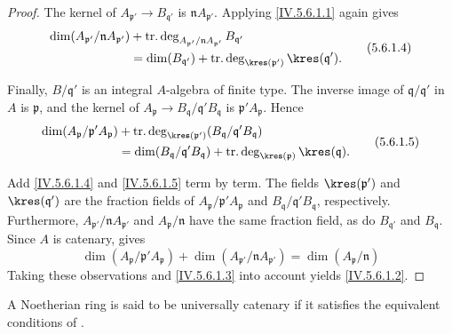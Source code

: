 \begin{proof}
The kernel of
$A_{\mathfrak p'}\to B_{\mathfrak q'}$ is
$\mathfrak nA_{\mathfrak p'}$.  Applying
\eqref{IV.5.6.1.1} again gives
\begin{equation}
\begin{split}
\dim(A_{\mathfrak p'}/\mathfrak nA_{\mathfrak p'})
 &+\operatorname{tr.deg}_{
      A_{\mathfrak p'}/\mathfrak nA_{\mathfrak p'}}
      B_{\mathfrak q'}\\
 &=\dim(B_{\mathfrak q'})
   +\operatorname{tr.deg}_{\kres(\mathfrak p')}
      \kres(\mathfrak q').
\end{split}
\tag{5.6.1.4}\label{IV.5.6.1.4}
\end{equation}

Finally, $B/\mathfrak q'$ is an integral $A$-algebra of finite type.
The inverse image of $\mathfrak q/\mathfrak q'$ in $A$ is
$\mathfrak p$, and the kernel of $A_{\mathfrak p}\longrightarrow
B_{\mathfrak q}/\mathfrak q'B_{\mathfrak q}$
is $\mathfrak p'A_{\mathfrak p}$.  Hence
\begin{equation}
\begin{split}
\dim(A_{\mathfrak p}/\mathfrak p'A_{\mathfrak p})
 &+\operatorname{tr.deg}_{\kres(\mathfrak p')}
   (B_{\mathfrak q}/\mathfrak q'B_{\mathfrak q})\\
 &=\dim(B_{\mathfrak q}/\mathfrak q'B_{\mathfrak q})
   +\operatorname{tr.deg}_{\kres(\mathfrak p)}
      \kres(\mathfrak q).
\end{split}
\tag{5.6.1.5}\label{IV.5.6.1.5}
\end{equation}

Add \eqref{IV.5.6.1.4} and \eqref{IV.5.6.1.5} term by term.
The fields $\kres(\mathfrak p')$ and
$\kres(\mathfrak q')$ are the fraction fields of
$A_{\mathfrak p}/\mathfrak p'A_{\mathfrak p}$ and
$B_{\mathfrak q}/\mathfrak q'B_{\mathfrak q}$, respectively.
Furthermore,
$A_{\mathfrak p'}/\mathfrak nA_{\mathfrak p'}$ and
$A_{\mathfrak p}/\mathfrak n$ have the same fraction field, as do
$B_{\mathfrak q'}$ and $B_{\mathfrak q}$.  Since $A$ is catenary,
 gives
\[
\dim(A_{\mathfrak p}/\mathfrak p'A_{\mathfrak p})
 +\dim(A_{\mathfrak p'}/\mathfrak nA_{\mathfrak p'})
 =\dim(A_{\mathfrak p}/\mathfrak n)
\]
Taking these observations and \eqref{IV.5.6.1.3} into account yields
\eqref{IV.5.6.1.2}.
\end{proof}

\begin{definition}[5.6.2]
\label{IV.5.6.2}
A Noetherian ring is said to be universally catenary if it
satisfies the equivalent conditions of .
\end{definition}

